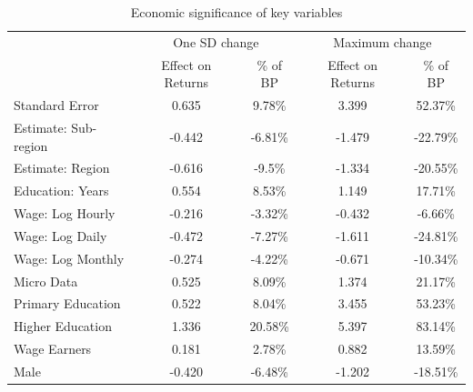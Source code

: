 \begin{table}[!htbp]
  \centering
  \scriptsize
  \singlespace
  \caption{Economic significance of key variables}
  \label{tab:econ_significance}
  \begin{tabular}{
      @{}
      l
      *{4}{c}
      @{}}
    \toprule
                          & \multicolumn{2}{c}{One SD change} & \multicolumn{2}{c}{Maximum change}                                \\
                          & Effect on Returns                 & \% of BP                           & Effect on Returns & \% of BP \\
    \midrule
    Standard Error        & 0.635                             & 9.78\%                             & 3.399             & 52.37\%  \\
    Estimate: Sub-region  & -0.442                            & -6.81\%                            & -1.479            & -22.79\% \\
    Estimate: Region      & -0.616                            & -9.5\%                             & -1.334            & -20.55\% \\
    Education: Years      & 0.554                             & 8.53\%                             & 1.149             & 17.71\%  \\
    Wage: Log Hourly      & -0.216                            & -3.32\%                            & -0.432            & -6.66\%  \\
    Wage: Log Daily       & -0.472                            & -7.27\%                            & -1.611            & -24.81\% \\
    Wage: Log Monthly     & -0.274                            & -4.22\%                            & -0.671            & -10.34\% \\
    Micro Data            & 0.525                             & 8.09\%                             & 1.374             & 21.17\%  \\
    Primary Education     & 0.522                             & 8.04\%                             & 3.455             & 53.23\%  \\
    Higher Education      & 1.336                             & 20.58\%                            & 5.397             & 83.14\%  \\
    Wage Earners          & 0.181                             & 2.78\%                             & 0.882             & 13.59\%  \\
    Male                  & -0.420                            & -6.48\%                            & -1.202            & -18.51\% \\

\end{tabular}
\end{table}
